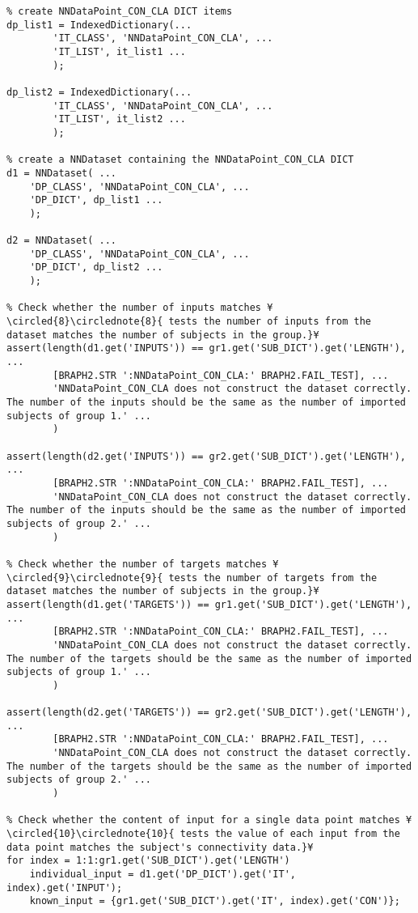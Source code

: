 \documentclass{tufte-handout}
\begin{document}
\begin{lstlisting}
% create NNDataPoint_CON_CLA DICT items
dp_list1 = IndexedDictionary(...
        'IT_CLASS', 'NNDataPoint_CON_CLA', ...
        'IT_LIST', it_list1 ...
        );

dp_list2 = IndexedDictionary(...
        'IT_CLASS', 'NNDataPoint_CON_CLA', ...
        'IT_LIST', it_list2 ...
        );

% create a NNDataset containing the NNDataPoint_CON_CLA DICT
d1 = NNDataset( ...
    'DP_CLASS', 'NNDataPoint_CON_CLA', ...
    'DP_DICT', dp_list1 ...
    );

d2 = NNDataset( ...
    'DP_CLASS', 'NNDataPoint_CON_CLA', ...
    'DP_DICT', dp_list2 ...
    );

% Check whether the number of inputs matches ¥\circled{8}\circlednote{8}{ tests the number of inputs from the dataset matches the number of subjects in the group.}¥
assert(length(d1.get('INPUTS')) == gr1.get('SUB_DICT').get('LENGTH'), ...
		[BRAPH2.STR ':NNDataPoint_CON_CLA:' BRAPH2.FAIL_TEST], ...
		'NNDataPoint_CON_CLA does not construct the dataset correctly. The number of the inputs should be the same as the number of imported subjects of group 1.' ...
		)

assert(length(d2.get('INPUTS')) == gr2.get('SUB_DICT').get('LENGTH'), ...
		[BRAPH2.STR ':NNDataPoint_CON_CLA:' BRAPH2.FAIL_TEST], ...
		'NNDataPoint_CON_CLA does not construct the dataset correctly. The number of the inputs should be the same as the number of imported subjects of group 2.' ...
		)

% Check whether the number of targets matches ¥\circled{9}\circlednote{9}{ tests the number of targets from the dataset matches the number of subjects in the group.}¥
assert(length(d1.get('TARGETS')) == gr1.get('SUB_DICT').get('LENGTH'), ...
		[BRAPH2.STR ':NNDataPoint_CON_CLA:' BRAPH2.FAIL_TEST], ...
		'NNDataPoint_CON_CLA does not construct the dataset correctly. The number of the targets should be the same as the number of imported subjects of group 1.' ...
		)

assert(length(d2.get('TARGETS')) == gr2.get('SUB_DICT').get('LENGTH'), ...
		[BRAPH2.STR ':NNDataPoint_CON_CLA:' BRAPH2.FAIL_TEST], ...
		'NNDataPoint_CON_CLA does not construct the dataset correctly. The number of the targets should be the same as the number of imported subjects of group 2.' ...
		)

% Check whether the content of input for a single data point matches ¥\circled{10}\circlednote{10}{ tests the value of each input from the data point matches the subject's connectivity data.}¥
for index = 1:1:gr1.get('SUB_DICT').get('LENGTH')
    individual_input = d1.get('DP_DICT').get('IT', index).get('INPUT');
    known_input = {gr1.get('SUB_DICT').get('IT', index).get('CON')};


\end{lstlisting}
\end{document}
